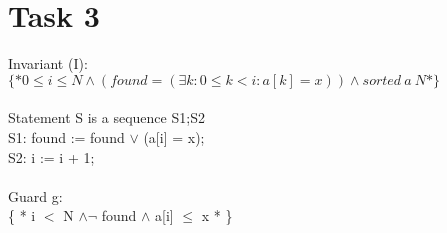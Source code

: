 \documentclass[fontsize=9p]{article}
\begin{document}
\section*{Task 3}
\noindent Invariant (I): \\
$\{* 0 \le i \le N \wedge (found = (\exists k : 0\le k < i : a[k] = x)) \wedge sorted \:a \:N *\}$ \\ \\

\noindent Statement S is a sequence S1;S2 \\
S1: found := found $\vee$ (a[i] = x); \\
S2: i := i + 1;  \\\\

\noindent Guard g:\\
\{ * i $<$ N $\wedge \neg$ found $\wedge$ a[i] $\le$ x * \} \\
\end{document}
